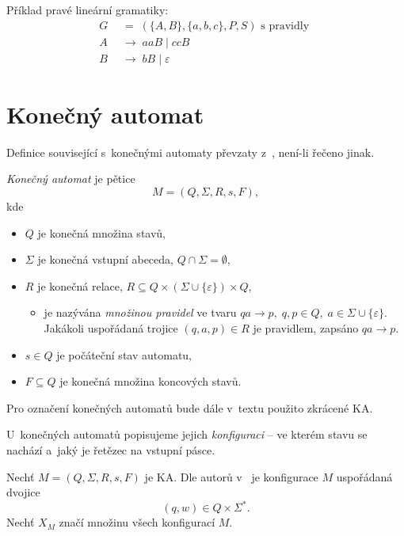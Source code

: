 \begin{example}
    Příklad pravé lineární gramatiky:
    \begin{align*}
        G \; &= \; (\{A, B\}, \{a, b, c\}, P, S) \text{ s~pravidly } \\
        A~\; &\rightarrow \; aaB \; | \; ccB \\
        B \; &\rightarrow \; bB \; | \; \varepsilon
    \end{align*}
\end{example}

\section{Konečný automat}
Definice související s~konečnými automaty převzaty z~\cite{meduna2023automata}, není-li řečeno jinak.
\begin{definition}\label{def_konecny_automat}
    \emph{Konečný automat} je pětice
    \begin{equation*}
        M = (Q, \Sigma, R, s, F),
    \end{equation*}
    kde
    \begin{itemize}
        \item $Q$ je konečná množina stavů,
        \item $\Sigma$ je konečná vstupní abeceda, $Q \cap \Sigma = \emptyset$,
        \item $R$ je konečná relace, $R \subseteq Q \times (\Sigma \cup \{\varepsilon\}) \times Q$,
        \begin{itemize}[label=$\circ$]
            \item je nazývána \emph{množinou pravidel} ve tvaru $qa \rightarrow p,\; q, p \in Q,\;a \in \Sigma \cup \{\varepsilon\}$.
            Jakákoli uspořádaná trojice $(q, a, p) \in R$ je pravidlem, zapsáno $qa \rightarrow p$.
        \end{itemize}
        \item $s \in Q$ je počáteční stav automatu,
        \item $F \subseteq Q$ je konečná množina koncových stavů. 
    \end{itemize}
\end{definition}

\begin{convention}
    Pro označení konečných automatů bude dále v~textu použito zkrácené KA. 
\end{convention}

U~konečných automatů popisujeme jejich \emph{konfiguraci} -- ve kterém stavu se nachází a~jaký je řetězec na vstupní pásce.
\begin{definition}\label{def_konfigurace_ka}
    Nechť $M = (Q, \Sigma, R, s, F)$ je KA. Dle autorů v~\cite{TIN-opora} je konfigurace $M$ uspořádaná dvojice
    \begin{equation*}
        (q, w) \in Q \times \Sigma^*.
    \end{equation*} 
    Nechť $X_M$ značí množinu všech konfigurací $M$.
\end{definition}


